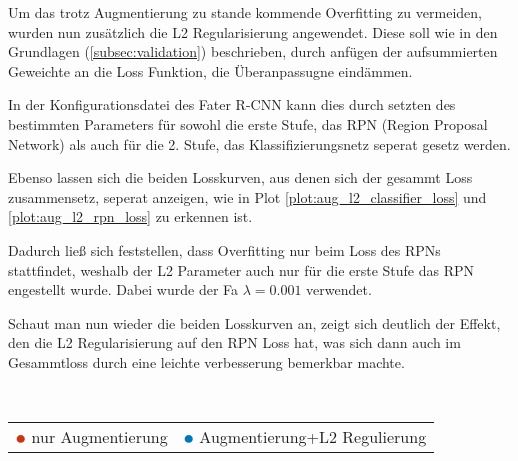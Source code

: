 Um das trotz Augmentierung zu stande kommende Overfitting zu 
vermeiden, wurden nun zusätzlich die L2 Regularisierung angewendet.
Diese soll wie in den Grundlagen (\ref{subsec:validation}) beschrieben, 
durch anfügen der aufsummierten Geweichte an die Loss Funktion, 
die Überanpassugne eindämmen.

In der Konfigurationsdatei des Fater R-CNN kann dies durch setzten des 
bestimmten Parameters für sowohl die erste Stufe, das RPN (Region Proposal Network)
als auch für die 2. Stufe, das Klassifizierungsnetz seperat gesetz werden.


Ebenso lassen sich die beiden Losskurven, aus denen sich der gesammt 
Loss zusammensetz, seperat anzeigen, wie in Plot \ref{plot:aug_l2_classifier_loss}
und \ref{plot:aug_l2_rpn_loss} zu erkennen ist.

Dadurch ließ sich feststellen, dass Overfitting nur beim Loss des RPNs 
stattfindet, weshalb der L2 Parameter auch nur für die erste Stufe 
das RPN engestellt wurde. Dabei wurde der Fa $\lambda = 0.001$ verwendet.

Schaut man nun wieder die beiden Losskurven an, zeigt sich deutlich der 
Effekt, den die L2 Regularisierung auf den RPN Loss hat, was sich dann 
auch im Gesammtloss durch eine leichte verbesserung bemerkbar machte.

\vspace{1cm}


\begin{minipage}{0.5\textwidth}
  \centering
  \def\svgwidth{0.9\textwidth}
  
  \label{plot:aug_l2_mAP}
\end{minipage}
\begin{minipage}{0.5\textwidth}
  \centering
  \def\svgwidth{0.9\textwidth}
  
  \label{plot:aug_l2_total_loss}
\end{minipage}
\\[1cm]
\begin{minipage}{0.5\textwidth}
  \centering
  \def\svgwidth{0.9\textwidth}
  
  \label{plot:aug_l2_classifier_loss}
\end{minipage}
\begin{minipage}{0.5\textwidth}
  \centering
  \def\svgwidth{0.9\textwidth}
  
  \label{plot:aug_l2_rpn_loss}
\end{minipage}
\begin{table}[htb]
  \centering
  \begin{tabular}{m{}<{\centering}m{}<{\centering}}
    $\color[HTML]{CC3311}\medbullet$  nur Augmentierung & $\color[HTML]{0077BB}\medbullet$  Augmentierung+L2 Regulierung
  \end{tabular}    
\end{table}


